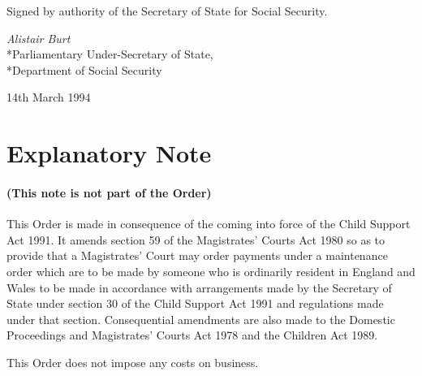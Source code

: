 \documentclass[a4paper]{article}
\newcommand{\parthead}{}
\begin{document}
\bigskip

Signed by authority of the Secretary of State for Social Security.

{\raggedleft
\emph{Alistair Burt}\\*Parliamentary Under-Secretary of State,\\*Department of Social Security

}

14th March 1994

\part{Explanatory Note}

\renewcommand\parthead{--- Explanatory Note}

\subsection*{(This note is not part of the Order)}

This Order is made in consequence of the coming into force of the Child Support Act 1991. It amends section 59 of the Magistrates' Courts Act 1980 so as to provide that a Magistrates' Court may order payments under a maintenance order which are to be made by someone who is ordinarily resident in England and Wales to be made in accordance with arrangements made by the Secretary of State under section 30 of the Child Support Act 1991 and regulations made under that section. Consequential amendments are also made to the Domestic Proceedings and Magistrates' Courts Act 1978 and the Children Act 1989.

  This Order does not impose any costs on business.
\end{document}
